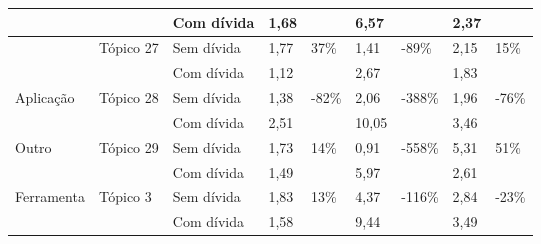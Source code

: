 \begin{longtable}{|l|l|l|l|l|l|l|l|l|}
                               &                            & Com dívida           & 1,68            &                         & 6,57            &                          & 2,37            &                         \\ \hline
                               
\newpage
\hline
\multirow{2}{*}{Arcabouço}     & \multirow{2}{*}{Tópico 27} & Sem dívida              & 1,77            & \multirow{2}{*}{37\%}   & 1,41            & \multirow{2}{*}{-89\%}   & 2,15            & \multirow{2}{*}{15\%}   \\ \cline{3-4} \cline{6-6} \cline{8-8}
                               &                            & Com dívida           & 1,12            &                         & 2,67            &                          & 1,83            &                         \\ \hline
\multirow{2}{*}{Aplicação}     & \multirow{2}{*}{Tópico 28} & Sem dívida              & 1,38            & \multirow{2}{*}{-82\%}  & 2,06            & \multirow{2}{*}{-388\%}  & 1,96            & \multirow{2}{*}{-76\%}  \\ \cline{3-4} \cline{6-6} \cline{8-8}
                               &                            & Com dívida           & 2,51            &                         & 10,05           &                          & 3,46            &                         \\ \hline
\multirow{2}{*}{Outro}         & \multirow{2}{*}{Tópico 29} & Sem dívida              & 1,73            & \multirow{2}{*}{14\%}   & 0,91            & \multirow{2}{*}{-558\%}  & 5,31            & \multirow{2}{*}{51\%}   \\ \cline{3-4}

 \cline{6-6} \cline{8-8}
                               &                            & Com dívida           & 1,49            &                         & 5,97            &                          & 2,61            &                         \\ \hline 

\multirow{2}{*}{Ferramenta}    & \multirow{2}{*}{Tópico 3}  & Sem dívida              & 1,83            & \multirow{2}{*}{13\%}   & 4,37            & \multirow{2}{*}{-116\%}  & 2,84            & \multirow{2}{*}{-23\%}  \\ \cline{3-4} \cline{6-6} \cline{8-8} 
                               &                            & Com dívida           & 1,58            &                         & 9,44            &                          & 3,49            &                         \\ \hline
                               


\end{longtable}
